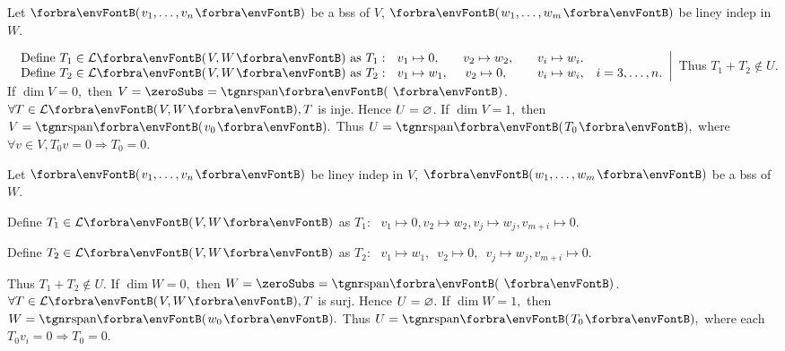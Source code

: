 \par\quad
Let $\Par{v_1,\dots,v_n}$ be a bss of $V$, $\Par{w_1,\dots,w_m}$ be liney indep in $W$. \par\hspace{0pt}
$\MathRightMid{l}{$
	Define $T_1\in\Lm{V,W}$ as $T_1:\,\,\,\,v_1\mapsto 0,$\qquad$v_2\mapsto w_2,$\qquad$v_i\mapsto w_i$.$\\$
	Define $T_2\in\Lm{V,W}$ as $T_2:\,\,\,\,v_1\mapsto w_1,$ \quad\,$v_2\mapsto 0,$\,\,\,\qquad$v_i\mapsto w_i$,\quad $i=3,\dots,n.}$ Thus $T_1+T_2\not\in U.$\PfEnd[-23pt]\vspace{10pt}
\AComm If $\dim V=0,$ then $V=\zeroSubs=\Span{\,}$. $\forall T\in\Lm{V,W}, T$ is inje. Hence $U=\varnothing$.\parCom
If $\dim V=1,$ then $V=\Span{v_0}.$ Thus $U=\Span{T_0},$ where $\forall v\in V,T_0 v=0\Rightarrow T_0=0.$\par
\SepLine

\par\quad
Let $\Par{v_1,\dots,v_n}$ be liney indep in $V$, $\Par{w_1,\dots,w_m}$ be a bss of $W$. \par\quad
Define $T_1\in\Lm{V,W}$ as $T_1:\,\,\,\,v_1\mapsto 0,$\qquad$v_2\mapsto w_2,$\qquad$v_j\mapsto w_j,$\qquad$v_{m+i}\mapsto 0.$\par\quad
Define $T_2\in\Lm{V,W}$ as $T_2:\,\,\,\,v_1\mapsto w_1,$\,\,\,\quad$v_2\mapsto 0,$\,\,\,\qquad$v_j\mapsto w_j,$\qquad$v_{m+i}\mapsto 0.$\par\quad
{} Thus $T_1+T_2\not\in U.$\PfEnd\vspace{2pt}
\AComm If $\dim W=0,$ then $W=\zeroSubs=\Span{\,}$. $\forall T\in\Lm{V,W}, T$ is surj. Hence $U=\varnothing.$\parCom
If $\dim W=1,$ then $W=\Span{w_0}.$ Thus $U=\Span{T_0},$ where each $T_0v_i=0\Rightarrow T_0=0.$\SepLine

